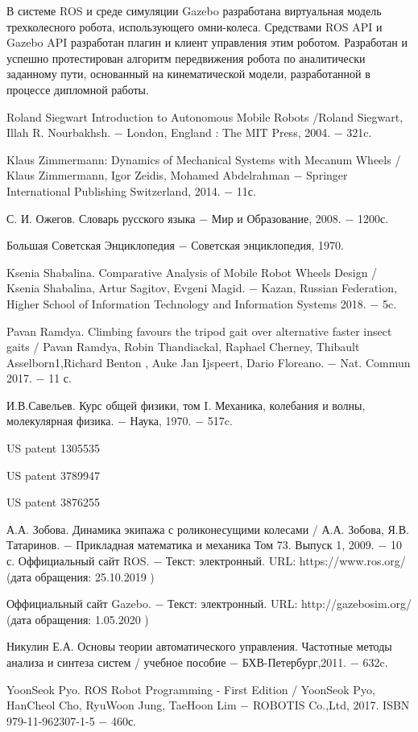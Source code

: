 \documentclass[oneside,final,14pt]{extreport}
\begin{document}
В системе ROS и  среде симуляции Gazebo разработана виртуальная модель трехколесного робота, использующего омни-колеса. Средствами ROS API и Gazebo API разработан плагин и клиент управления этим роботом. Разработан и успешно протестирован алгоритм передвижения робота по аналитически заданному пути, основанный на кинематической модели, разработанной в процессе дипломной работы.
\newpage
\begin{thebibliography}{0}

Roland Siegwart
Introduction to Autonomous Mobile Robots /Roland Siegwart, Illah R. Nourbakhsh.
$-$ London, England
: The MIT Press, 2004. $-$ 321c.

Klaus Zimmermann:
Dynamics of Mechanical Systems
with Mecanum Wheels / Klaus Zimmermann, Igor Zeidis, Mohamed Abdelrahman
$-$  Springer International Publishing Switzerland, 2014. $-$ 11с.

С. И. Ожегов.
Словарь русского языка
$-$ Мир и Образование, 2008. $-$ 1200с.

Большая Советская Энциклопедия $-$ Советская энциклопедия, 1970.

Ksenia Shabalina.
Comparative Analysis of Mobile Robot Wheels
Design
/
Ksenia Shabalina, Artur Sagitov, Evgeni Magid.
$-$  Kazan, Russian Federation, Higher School of Information Technology and Information Systems
 2018. $-$ 5c.

Pavan Ramdya.
Climbing favours the tripod gait over alternative
faster insect gaits
/
Pavan Ramdya, Robin Thandiackal, Raphael Cherney, Thibault Asselborn1,Richard Benton ,
Auke Jan Ijspeert, Dario Floreano.
$-$ Nat. Commun 2017. $-$  11 с.

И.В.Савельев.
Курс общей физики, том I.
Механика, колебания и волны, молекулярная физика.
$-$ Наука, 1970. $-$ 517c.

US patent 1305535

US patent 3789947

US patent 3876255

А.А. Зобова.
Динамика экипажа с роликонесущими колесами
/ 
А.А. Зобова, Я.В. Татаринов. 
$-$ Прикладная математика и механика Том	73. Выпуск 1, 2009. $-$ 10 с.
Оффициальный сайт ROS. $-$ Текст: электронный. URL: https://www.ros.org/ (дата обращения: 25.10.2019 )

Оффициальный сайт Gazebo. $-$ Текст: электронный. URL: http://gazebosim.org/ (дата обращения: 1.05.2020 )


Никулин Е.А. Основы теории автоматического управления. Частотные методы анализа и синтеза систем / учебное пособие $-$ БХВ-Петербург,2011. $-$ 632c.

YoonSeok Pyo.
ROS Robot Programming - First Edition
/
YoonSeok Pyo, HanCheol Cho, RyuWoon Jung, TaeHoon Lim
$-$  ROBOTIS Co.,Ltd, 2017. ISBN
 979-11-962307-1-5
 $-$ 460с.

\end{thebibliography}
\end{document}
